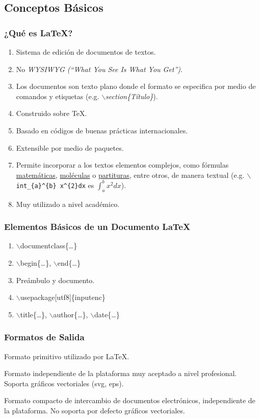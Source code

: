 \documentclass[a4paper,slidestop,xcolor=pst,dvips,blue]{beamer}
\newcommand{\command}[1]{$\backslash$#1\{\dots\}}
\begin{document}
\subsection{Conceptos Básicos}

\begin{frame}[c]
    \frametitle{¿Qué es \LaTeX?}
    \begin{enumerate}[<+->]
        \item Sistema de edición de documentos de textos.
        \item No \emph{WYSIWYG (``What You See Is What You Get'')}.
        \item Los documentos son texto plano donde el formato se especifica por medio de comandos y etiquetas (e.g. \emph{$\backslash$section\{Título\}}).
        \item Construido sobre \TeX.
        \item Basado en códigos de buenas prácticas internacionales.
        \item Extensible por medio de paquetes.
        \item Permite incorporar a los textos elementos complejos, como fórmulas \href{https://es.overleaf.com/learn/latex/Mathematical_expressions}{matemáticas}, \href{https://osl.ugr.es/CTAN/macros/generic/chemfig/chemfig-en.pdf}{moléculas} o 
            \href{http://tug.ctan.org/info/latex4musicians/latex4musicians.pdf}{partituras}, entre otros, de manera textual (e.g. \texttt{$\backslash$int\_\{a\}\^{}\{b\} x\^{}\{2\}dx} es $\int_{a}^{b} x^{2} dx$).
        \item Muy utilizado a nivel académico. 
    \end{enumerate}
\end{frame}

\begin{frame}[c]
    \frametitle{Elementos Básicos de un Documento \LaTeX}
    \begin{enumerate}[<+->]
        \item \command{documentclass}
        \item \command{begin}, \command{end}
        \item Preámbulo y documento.
        \item $\backslash$usepackage[utf8]\{inputenc\}
        \item \command{title}, \command{author}, \command{date}
    \end{enumerate}
\end{frame}

\begin{frame}[c]
    \frametitle{Formatos de Salida}
    \begin{description}[<+->]
        \item[DVI] Formato primitivo utilizado por \LaTeX.
        \item[Postscript] Formato independiente de la plataforma muy aceptado a nivel profesional. Soporta gráficos vectoriales (svg, eps).
        \item[PDF] Formato compacto de intercambio de documentos electrónicos, independiente de la plataforma. No soporta por defecto gráficos vectoriales.
    \end{description}
\end{frame}
\end{document}
